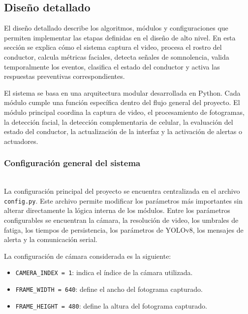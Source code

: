 \documentclass[conference]{IEEEtran}
\begin{document}

\subsection{Diseño detallado}

El diseño detallado describe los algoritmos, módulos y configuraciones que permiten implementar las etapas definidas en el diseño de alto nivel. En esta sección se explica cómo el sistema captura el video, procesa el rostro del conductor, calcula métricas faciales, detecta señales de somnolencia, valida temporalmente los eventos, clasifica el estado del conductor y activa las respuestas preventivas correspondientes.

El sistema se basa en una arquitectura modular desarrollada en Python. Cada módulo cumple una función específica dentro del flujo general del proyecto. El módulo principal coordina la captura de video, el procesamiento de fotogramas, la detección facial, la detección complementaria de celular, la evaluación del estado del conductor, la actualización de la interfaz y la activación de alertas o actuadores.

\subsubsection{Configuración general del sistema}\mbox{}\\

La configuración principal del proyecto se encuentra centralizada en el archivo \texttt{config.py}. Este archivo permite modificar los parámetros más importantes sin alterar directamente la lógica interna de los módulos. Entre los parámetros configurables se encuentran la cámara, la resolución de video, los umbrales de fatiga, los tiempos de persistencia, los parámetros de YOLOv8, los mensajes de alerta y la comunicación serial.

La configuración de cámara considerada es la siguiente:

\begin{itemize}
    \item \texttt{CAMERA\_INDEX = 1}: indica el índice de la cámara utilizada.
    
    \item \texttt{FRAME\_WIDTH = 640}: define el ancho del fotograma capturado.
    
    \item \texttt{FRAME\_HEIGHT = 480}: define la altura del fotograma capturado.
\end{itemize}
\end{document}
